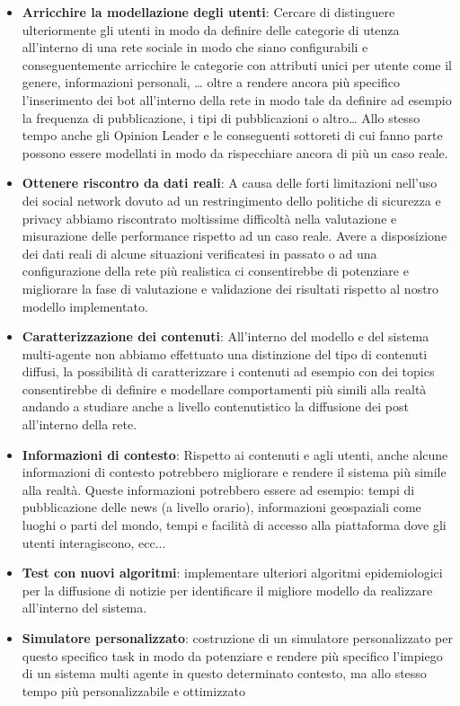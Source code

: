     \begin{itemize}
        \item \textbf{Arricchire la modellazione degli utenti}: Cercare di distinguere ulteriormente gli utenti in modo da definire delle categorie di utenza all'interno di una rete sociale in modo che siano configurabili e conseguentemente arricchire le categorie con attributi unici per utente come il genere, informazioni personali, … oltre a rendere ancora più specifico l'inserimento dei bot all'interno della rete in modo tale da definire ad esempio la frequenza di pubblicazione, i tipi di pubblicazioni o altro… Allo stesso tempo anche gli Opinion Leader e le conseguenti sottoreti di cui fanno parte possono essere modellati in modo da rispecchiare ancora di più un caso reale.
        \item \textbf{Ottenere riscontro da dati reali}: A causa delle forti limitazioni nell'uso dei social network dovuto ad un restringimento dello politiche di sicurezza e privacy abbiamo riscontrato moltissime difficoltà nella valutazione e misurazione delle performance rispetto ad un caso reale. Avere a disposizione dei dati reali di alcune situazioni verificatesi in passato o ad una configurazione della rete più realistica ci consentirebbe di potenziare e migliorare la fase di valutazione e validazione dei risultati rispetto al nostro modello implementato.
        \item \textbf{Caratterizzazione dei contenuti}: All'interno del modello e del sistema multi-agente non abbiamo effettuato una distinzione del tipo di contenuti diffusi, la possibilità di caratterizzare i contenuti ad esempio con dei topics consentirebbe di definire e modellare comportamenti più simili alla realtà andando a studiare anche a livello contenutistico la diffusione dei post all'interno della rete.
        \item \textbf{Informazioni di contesto}: Rispetto ai contenuti e agli utenti, anche alcune informazioni di contesto potrebbero migliorare e rendere il sistema più simile alla realtà. Queste informazioni potrebbero essere ad esempio: tempi di pubblicazione delle news (a livello orario), informazioni geospaziali come luoghi o parti del mondo, tempi e facilità di accesso alla piattaforma dove gli utenti interagiscono, ecc...
        \item \textbf{Test con nuovi algoritmi}: implementare ulteriori algoritmi epidemiologici per la diffusione di notizie per identificare il migliore modello da realizzare all'interno del sistema.
        \item \textbf{Simulatore personalizzato}: costruzione di un simulatore personalizzato per questo specifico task in modo da potenziare e rendere più specifico l'impiego di un sistema multi agente in questo determinato contesto, ma allo stesso tempo più personalizzabile e ottimizzato
    \end{itemize}
